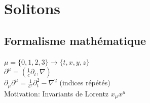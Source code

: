 \documentclass[handout]{beamer}
\begin{document}
\section{Solitons}

%
%      

\subsection{Formalisme mathématique}
\begin{frame}
\begin{exampleblock}{}
 $\mu = \{0,1,2,3\} \rightarrow \{t,x,y,z\}$\\[0.25 cm]
 $\partial^\mu =(\frac{1}{c} \partial_t, \nabla) $\\[0.25 cm]
 $\partial_\mu \partial^\mu = \frac{1}{c^2} \partial_t^2- \nabla^2 $ (indices répétés)\\[0.25 cm]
 Motivation: Invariants de Lorentz $x_\mu x^\mu$\\
\end{exampleblock}
\end{frame}
\end{document}
